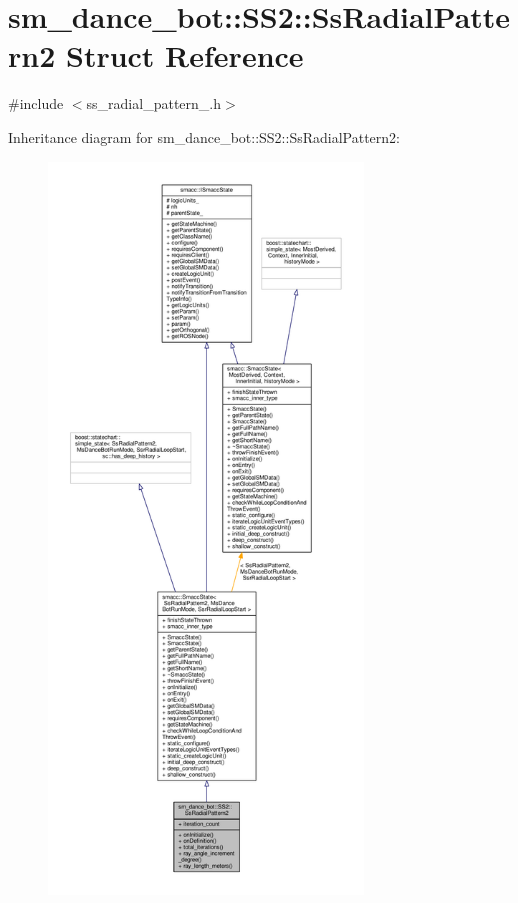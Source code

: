 \hypertarget{structsm__dance__bot_1_1SS2_1_1SsRadialPattern2}{}\section{sm\+\_\+dance\+\_\+bot\+:\+:S\+S2\+:\+:Ss\+Radial\+Pattern2 Struct Reference}
\label{structsm__dance__bot_1_1SS2_1_1SsRadialPattern2}


{\ttfamily \#include $<$ss\+\_\+radial\+\_\+pattern\+\_.\+h$>$}



Inheritance diagram for sm\+\_\+dance\+\_\+bot\+:\+:S\+S2\+:\+:Ss\+Radial\+Pattern2\+:\nopagebreak
\begin{figure}[H]
\begin{center}
\leavevmode
\includegraphics[height=550pt]{structsm__dance__bot_1_1SS2_1_1SsRadialPattern2__inherit__graph}
\end{center}
\end{figure}


